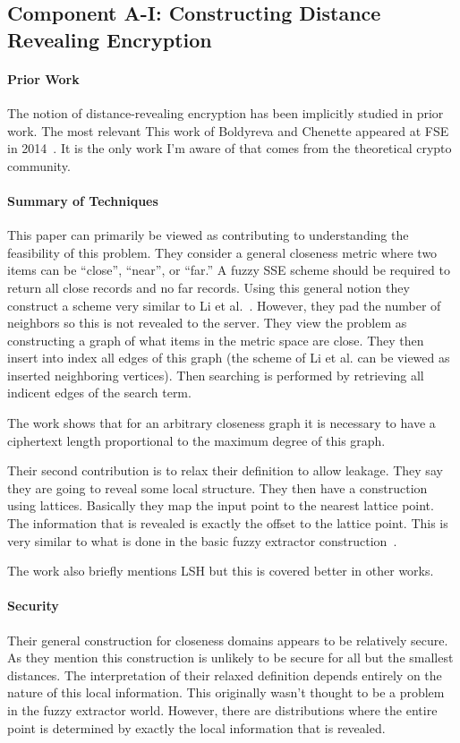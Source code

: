 \subsection{Component A-I: Constructing Distance Revealing Encryption}
\paragraph{Prior Work}
The notion of distance-revealing encryption has been implicitly studied in prior work.  The most relevant This work of Boldyreva and Chenette appeared at FSE in 2014~\cite{boldyreva2014efficient}.  It is the only work I'm aware of that comes from the theoretical crypto community.  

\paragraph{Summary of Techniques}  This paper can primarily be viewed as contributing to understanding the feasibility of this problem.  They consider a general closeness metric where two items can be ``close'', ``near'', or ``far.''  A fuzzy SSE scheme should be required to return all close records and no far records.  Using this general notion they construct a scheme very similar to Li et al.~\cite{li2010fuzzy}.  However, they pad the number of neighbors so this is not revealed to the server.  They view the problem as constructing a graph of what items in the metric space are close.  They then insert into index all edges of this graph (the scheme of Li et al. can be viewed as inserted neighboring vertices).  Then searching is performed by retrieving all indicent edges of the search term.

The work shows that for an arbitrary closeness graph it is necessary to have a ciphertext length proportional to the maximum degree of this graph.  

Their second contribution is to relax their definition to allow leakage.  They say they are going to reveal some local structure.  They then have a construction using lattices.  Basically they map the input point to the nearest lattice point.  The information that is revealed is exactly the offset to the lattice point.  This is very similar to what is done in the basic fuzzy extractor construction~\cite{DBLP:journals/siamcomp/DodisORS08}.

The work also briefly mentions LSH but this is covered better in other works.

\paragraph{Security}  Their general construction for closeness domains appears to be relatively secure.  As they mention this construction is unlikely to be secure for all but the smallest distances.    The interpretation of their relaxed definition depends entirely on the nature of this local information.  This originally wasn't thought to be a problem in the fuzzy extractor world.  However, there are distributions where the entire point is determined by exactly the local information that is revealed.

